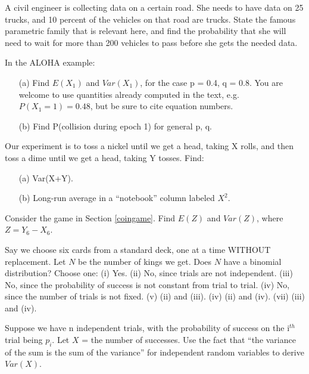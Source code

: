 \oneproblem
A civil engineer is collecting data on a certain road.  She needs to
have data on 25 trucks, and 10 percent of the vehicles on that road are
trucks.  State the famous parametric family that is relevant here, and
find the probability that she will need to wait for more than
200 vehicles to pass before she gets the needed data.

\oneproblem
In the ALOHA example:

\begin{itemize}

\item [(a)] Find $E(X_1)$ and $Var(X_1)$, for the case p = 0.4, q = 0.8.
You are welcome to use quantities already computed in the text, e.g.
$P(X_1 = 1) = 0.48$, but be sure to cite equation numbers.

\item [(b)] Find P(collision during epoch 1) for general p, q.

\end{itemize}

\oneproblem
Our experiment is to toss a nickel until we get a head, taking
X rolls, and then toss a dime until we get a head, taking Y tosses.
Find:

\begin{itemize}

\item [(a)] Var(X+Y).

\item [(b)] Long-run average in a ``notebook'' column labeled $X^2$.

\end{itemize}

\oneproblem
Consider the game in Section \ref{coingame}.  Find $E(Z)$ and $Var(Z)$,
where $Z = Y_6 - X_6$.

\oneproblem
Say we choose six cards from a standard deck, one at a time WITHOUT
replacement.  Let $N$ be the number of kings we get.  Does $N$ have a
binomial distribution?  Choose one: (i)  Yes.  (ii) No, since trials are
not independent.  (iii) No, since the probability of success is not
constant from trial to trial.  (iv) No, since the number of trials is not
fixed.  (v) (ii) and (iii).  (iv) (ii) and (iv).  (vii) (iii) and (iv).  

\oneproblem
Suppose we have n independent trials, with the probability
of success on the i$^{th}$ trial being $p_i$.  Let $X$ = the number of
successes.  Use the fact that ``the variance of the sum is the sum of
the variance'' for independent random variables to derive $Var(X)$.

